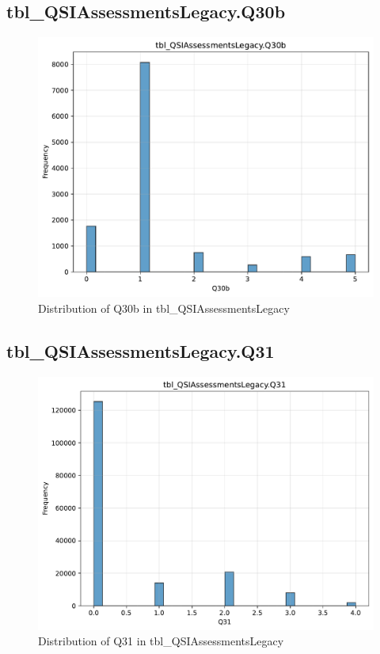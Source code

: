 \subsection{tbl\_QSIAssessmentsLegacy.Q30b}

\begin{figure}[htbp]
\centering
\includegraphics[width=\textwidth]{figures/dbo_tbl_QSIAssessmentsLegacy_Q30b.pdf}
\caption{Distribution of Q30b in tbl\_QSIAssessmentsLegacy}
\end{figure}\newpage

\subsection{tbl\_QSIAssessmentsLegacy.Q31}

\begin{figure}[htbp]
\centering
\includegraphics[width=\textwidth]{figures/dbo_tbl_QSIAssessmentsLegacy_Q31.pdf}
\caption{Distribution of Q31 in tbl\_QSIAssessmentsLegacy}
\end{figure}\newpage


